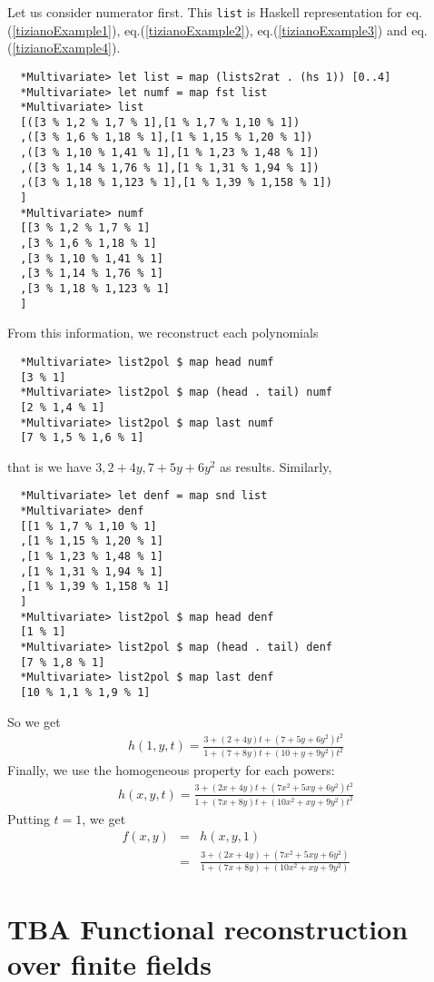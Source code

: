 \documentclass[11pt]{book}
\begin{document}
Let us consider numerator first.
This \texttt{list} is Haskell representation for eq.(\ref{tizianoExample1}), eq.(\ref{tizianoExample2}), eq.(\ref{tizianoExample3}) and eq.(\ref{tizianoExample4}).
\begin{verbatim}
  *Multivariate> let list = map (lists2rat . (hs 1)) [0..4]
  *Multivariate> let numf = map fst list
  *Multivariate> list
  [([3 % 1,2 % 1,7 % 1],[1 % 1,7 % 1,10 % 1])
  ,([3 % 1,6 % 1,18 % 1],[1 % 1,15 % 1,20 % 1])
  ,([3 % 1,10 % 1,41 % 1],[1 % 1,23 % 1,48 % 1])
  ,([3 % 1,14 % 1,76 % 1],[1 % 1,31 % 1,94 % 1])
  ,([3 % 1,18 % 1,123 % 1],[1 % 1,39 % 1,158 % 1])
  ]
  *Multivariate> numf
  [[3 % 1,2 % 1,7 % 1]
  ,[3 % 1,6 % 1,18 % 1]
  ,[3 % 1,10 % 1,41 % 1]
  ,[3 % 1,14 % 1,76 % 1]
  ,[3 % 1,18 % 1,123 % 1]
  ]
\end{verbatim}
From this information, we reconstruct each polynomials
\begin{verbatim}
  *Multivariate> list2pol $ map head numf
  [3 % 1]
  *Multivariate> list2pol $ map (head . tail) numf
  [2 % 1,4 % 1]
  *Multivariate> list2pol $ map last numf
  [7 % 1,5 % 1,6 % 1]
\end{verbatim}
that is we have $3, 2+4y, 7+5y+6y^2$ as results.
Similarly,
\begin{verbatim}
  *Multivariate> let denf = map snd list
  *Multivariate> denf
  [[1 % 1,7 % 1,10 % 1]
  ,[1 % 1,15 % 1,20 % 1]
  ,[1 % 1,23 % 1,48 % 1]
  ,[1 % 1,31 % 1,94 % 1]
  ,[1 % 1,39 % 1,158 % 1]
  ]
  *Multivariate> list2pol $ map head denf
  [1 % 1]
  *Multivariate> list2pol $ map (head . tail) denf
  [7 % 1,8 % 1]
  *Multivariate> list2pol $ map last denf
  [10 % 1,1 % 1,9 % 1]
\end{verbatim}
So we get
\begin{eqnarray}
h(1,y,t) = \frac{3 + (2+4y)t + (7+5y+6y^2)t^2}{1 + (7+8y)t + (10+y+9y^2)t^2}
\end{eqnarray}
Finally, we use the homogeneous property for each powers:
\begin{eqnarray}
h(x,y,t) = \frac{3 + (2x+4y)t + (7x^2+5xy+6y^2)t^2}{1 + (7x+8y)t + (10x^2+xy+9y^2)t^2}
\end{eqnarray}
Putting $t=1$, we get
\begin{eqnarray}
f(x,y) &=& h(x,y,1) \\
&=& \frac{3 + (2x+4y) + (7x^2+5xy+6y^2)}{1 + (7x+8y) + (10x^2+xy+9y^2)}
\end{eqnarray}

\chapter{TBA Functional reconstruction over finite fields}
\end{document}

